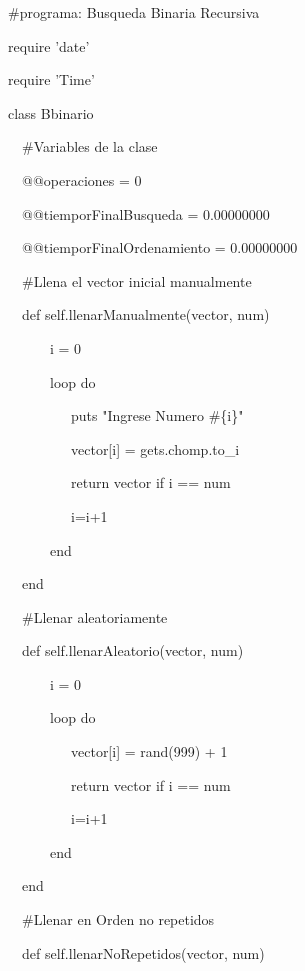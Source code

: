 {
\ttfamily \scriptsize



\noindent \#programa: Busqueda Binaria Recursiva

\bigskip 
\noindent require 'date'

\noindent require 'Time'

\bigskip 
\noindent class Bbinario

\bigskip 
\noindent \ \   \#Variables de la clase

\noindent \ \   @@operaciones = 0  

\noindent \ \   @@tiemporFinalBusqueda = 0.00000000

\noindent \ \   @@tiemporFinalOrdenamiento = 0.00000000

\noindent \ \   \#Llena el vector inicial manualmente

\noindent \ \   def self.llenarManualmente(vector, num)

\noindent \ \ \ \ \ \       i = 0

\noindent \ \ \ \ \ \       loop do

\noindent \ \ \ \ \ \ \ \ \          puts "Ingrese Numero \#\{i\}"

\noindent \ \ \ \ \ \ \ \ \          vector[i] = gets.chomp.to\_i

\noindent \ \ \ \ \ \ \ \ \          return vector if i == num

\noindent \ \ \ \ \ \ \ \ \          i=i+1

\noindent \ \ \ \ \ \       end

\noindent \ \   end

\bigskip 
\noindent \ \   \#Llenar aleatoriamente

\noindent \ \   def self.llenarAleatorio(vector, num)

\bigskip
\noindent \ \ \ \ \ \       i = 0      

\noindent \ \ \ \ \ \       loop do         

\noindent \ \ \ \ \ \ \ \ \          vector[i] = rand(999) + 1

\noindent \ \ \ \ \ \ \ \ \          return vector if i == num

\noindent \ \ \ \ \ \ \ \ \          i=i+1

\noindent \ \ \ \ \ \       end

\noindent \ \   end

\bigskip 
\noindent \ \   \#Llenar en Orden no repetidos

\noindent \ \   def self.llenarNoRepetidos(vector, num)

}
